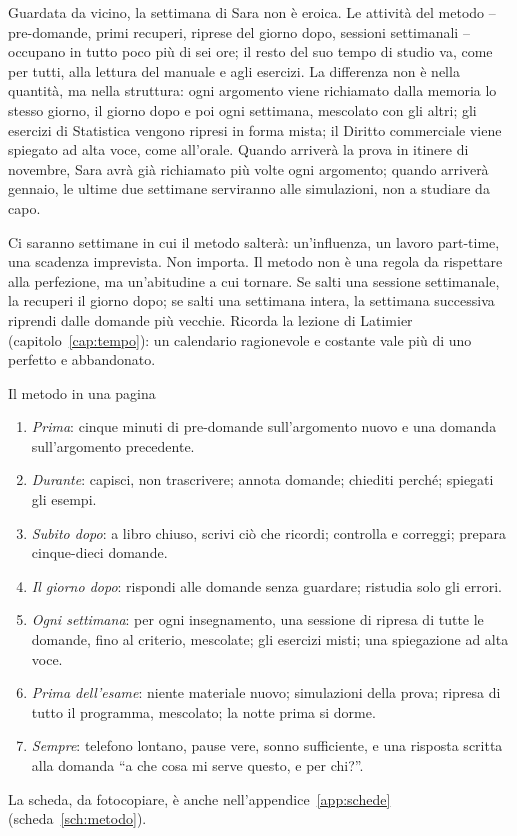 Guardata da vicino, la settimana di Sara non è eroica. Le attività del
metodo -- pre-domande, primi recuperi, riprese del giorno dopo, sessioni
settimanali -- occupano in tutto poco più di sei ore; il resto del suo
tempo di studio va, come per tutti, alla lettura del manuale e agli
esercizi. La differenza non è nella quantità, ma nella struttura: ogni
argomento viene richiamato dalla memoria lo stesso giorno, il giorno
dopo e poi ogni settimana, mescolato con gli altri; gli esercizi di
Statistica vengono ripresi in forma mista; il Diritto commerciale viene
spiegato ad alta voce, come all'orale. Quando arriverà la prova in
itinere di novembre, Sara avrà già richiamato più volte ogni argomento;
quando arriverà gennaio, le ultime due settimane serviranno alle
simulazioni, non a studiare da capo.

Ci saranno settimane in cui il metodo salterà: un'influenza, un lavoro
part-time, una scadenza imprevista. Non importa. Il metodo non è una
regola da rispettare alla perfezione, ma un'abitudine a cui tornare. Se
salti una sessione settimanale, la recuperi il giorno dopo; se salti
una settimana intera, la settimana successiva riprendi dalle domande
più vecchie. Ricorda la lezione di Latimier (capitolo~\ref{cap:tempo}):
un calendario ragionevole e costante vale più di uno perfetto e
abbandonato.

\begin{riquadro}{Il metodo in una pagina}
\begin{enumerate}
  \item \emph{Prima}: cinque minuti di pre-domande sull'argomento
        nuovo e una domanda sull'argomento precedente.
  \item \emph{Durante}: capisci, non trascrivere; annota domande;
        chiediti perché; spiegati gli esempi.
  \item \emph{Subito dopo}: a libro chiuso, scrivi ciò che ricordi;
        controlla e correggi; prepara cinque-dieci domande.
  \item \emph{Il giorno dopo}: rispondi alle domande senza guardare;
        ristudia solo gli errori.
  \item \emph{Ogni settimana}: per ogni insegnamento, una sessione di
        ripresa di tutte le domande, fino al criterio, mescolate; gli
        esercizi misti; una spiegazione ad alta voce.
  \item \emph{Prima dell'esame}: niente materiale nuovo; simulazioni
        della prova; ripresa di tutto il programma, mescolato; la notte
        prima si dorme.
  \item \emph{Sempre}: telefono lontano, pause vere, sonno sufficiente,
        e una risposta scritta alla domanda \enquote{a che cosa mi
        serve questo, e per chi?}.
\end{enumerate}
La scheda, da fotocopiare, è anche nell'appendice~\ref{app:schede} (scheda~\ref{sch:metodo}).
\end{riquadro}

